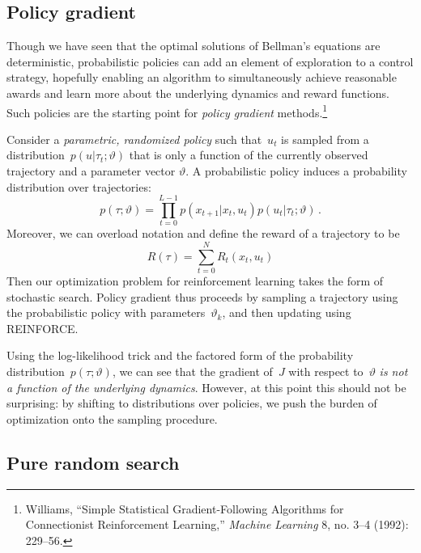 \documentclass{tufte-book}
\begin{document}
\hypertarget{policy-gradient}{%
\subsection{Policy gradient}\label{policy-gradient}}

Though we have seen that the optimal solutions of Bellman's equations
are deterministic, probabilistic policies can add an element of
exploration to a control strategy, hopefully enabling an algorithm to
simultaneously achieve reasonable awards and learn more about the
underlying dynamics and reward functions. Such policies are the starting
point for \emph{policy gradient}
methods.\footnote{Williams, {``Simple Statistical Gradient-Following
  Algorithms for Connectionist Reinforcement Learning,''} \emph{Machine
  Learning} 8, no. 3--4 (1992): 229--56.}

Consider a \emph{parametric, randomized policy} such that~\(u_t\) is
sampled from a distribution~\(p(u \vert \tau_t;\vartheta)\) that is only
a function of the currently observed trajectory and a parameter vector
\(\vartheta\). A probabilistic policy induces a probability distribution
over trajectories: \[
    p(\tau;\vartheta) = \prod_{t=0}^{L-1} p(x_{t+1} \vert x_{t},u_{t}) p(u_t \vert \tau_t ;\vartheta)\,.
\] Moreover, we can overload notation and define the reward of a
trajectory to be \[
    R(\tau) = \sum_{t=0}^N R_t(x_t,u_t)
\] Then our optimization problem for reinforcement learning takes the
form of stochastic search. Policy gradient thus proceeds by sampling a
trajectory using the probabilistic policy with
parameters~\(\vartheta_k\), and then updating using REINFORCE.

Using the log-likelihood trick and the factored form of the probability
distribution~\(p(\tau;\vartheta)\), we can see that the gradient
of~\(J\) with respect to~\(\vartheta\) \emph{is not a function of the
underlying dynamics}. However, at this point this should not be
surprising: by shifting to distributions over policies, we push the
burden of optimization onto the sampling procedure.

\hypertarget{pure-random-search}{%
\subsection{Pure random search}\label{pure-random-search}}

\end{document}
